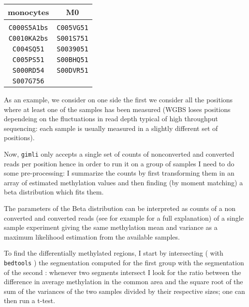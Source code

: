 \documentclass[12pt]{amsart}
\newcommand{\gimli}{\texttt{gimli}}
\begin{document}
\begin{center}
\begin{tabular}{c|c}
monocytes & M0  \\
\hline \\
\texttt{C000S5A1bs} & \texttt{C005VG51} \\
\texttt{C0010KA2bs} & \texttt{S001S751} \\
\texttt{C004SQ51} & \texttt{S0039051} \\
\texttt{C005PS51} & \texttt{S00BHQ51}\\
\texttt{S000RD54} & \texttt{S00DVR51} \\
\texttt{S007G756} &  \\
\hline
\end{tabular}
\end{center}



As an example, we consider on one side the 
first we consider all the positions where at least one of the samples has been measured
(WGBS loses positions dependeing on the fluctuations in read depth typical of high throughput sequencing: 
each sample is usually measured in a slightly different set of positions).

Now, \gimli{} only accepts a single set of counts of nonconverted and converted reads per position
hence in order to run it on a group of samples I need to do some pre-processing:  I 
summarize the counts by first transforming them in an array of estimated methylation
values and then finding (by moment matching) a beta distribution which fits them.

The parameters of the Beta distribution can be interpreted as counts of 
a non converted and converted reads (see for example \cite{methyldiff} for a full explanation) 
of a single sample experiment giving the same methylation mean 
and variance as a maximum likelihood estimation from the available samples.

To find the differentially methylated regions, I start by intersecting
( with \texttt{bedtools}\cite{bedtools} ) the segmentation computed for the first group
with the segmentation of the second : whenever two segments intersect I look
for the ratio between the difference in average methylation in the common area 
and the square root of the sum of the variances of the two samples divided by their respective
sizes; one can then run a t-test.
\end{document}
